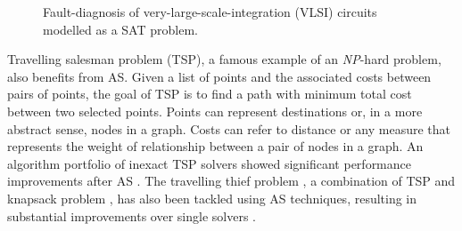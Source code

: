 \begin{figure}[H]
	\centering
	\caption[Fault-diagnosis of very-large-scale-integration (VLSI) circuits modelled as a SAT problem]{Fault-diagnosis of very-large-scale-integration (VLSI) circuits modelled as a SAT problem. \citep{smith2005fault}}
	\label{fig:logiccircuits}
\end{figure}

Travelling salesman problem (TSP), a famous example of an \textit{NP}-hard problem, also benefits from AS. Given a list of points and the associated costs between pairs of points, the goal of TSP is to find a path with minimum total cost between two selected points. Points can represent destinations or, in a more abstract sense, nodes in a graph. Costs can refer to distance or any measure that represents the weight of relationship between a pair of nodes in a graph. An algorithm portfolio of inexact TSP solvers showed significant performance improvements after AS \citep{kotthoff2015improving}. The travelling thief problem \citep{bonyadi2013travelling}, a combination of TSP and knapsack problem \citep{kellerer2004introduction}, has also been tackled using AS techniques, resulting in substantial improvements over single solvers \citep{wagner2018case}. 

